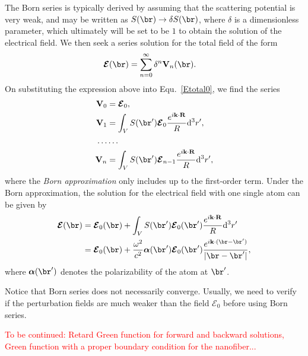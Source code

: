 \documentclass[]{report}
\begin{document}
The Born series is typically derived by assuming that the scattering potential is very
weak, and may be written as $ S(\br)\rightarrow \delta S(\br) $, where $ \delta $ is a dimensionless parameter, which ultimately will be set to be $ 1 $ to obtain the solution of the electrical field. We then seek a series solution for the total field of the form
\begin{align}
\boldsymbol{\mathcal{E}}(\br) &= \sum_{n=0}^{\infty} \delta^n \mathbf{V}_n(\br).
\end{align}
On substituting the expression above into Equ.~\ref{Etotal0}, we find the series
\begin{align}
\mathbf{V}_0 &= \boldsymbol{\mathcal{E}}_0,\\
\mathbf{V}_1 &= \int_V S(\br') \boldsymbol{\mathcal{E}}_0 \frac{e^{i\mathbf{k}\cdot \mathbf{R}}}{R} \mathrm{d}^3 r',\\
\ldots & \ldots\\
\mathbf{V}_n &= \int_V S(\br') \boldsymbol{\mathcal{E}}_{n-1} \frac{e^{i\mathbf{k}\cdot \mathbf{R}}}{R} \mathrm{d}^3 r',
\end{align}
where the \textit{Born approximation} only includes up to the first-order term. Under the Born approximation, the solution for the electrical field with one single atom can be given by
\begin{align}
\boldsymbol{\mathcal{E}} (\br) &= \boldsymbol{\mathcal{E}}_0 (\br) + \int_V S(\br') \boldsymbol{\mathcal{E}}_0 (\br') \frac{e^{i\mathbf{k}\cdot \mathbf{R}}}{R} \mathrm{d}^3 r'\\
&= \boldsymbol{\mathcal{E}}_0(\br) + \frac{\omega^2}{c^2} \boldsymbol{\alpha}(\br') \boldsymbol{\mathcal{E}}_0 (\br')\frac{e^{i\mathbf{k}\cdot (\br-\br')}}{|\br-\br'|},
\end{align}
where $ \boldsymbol{\alpha}(\br') $ denotes the polarizability of the atom at $ \br' $. 

Notice that Born series does not necessarily converge. Usually, we need to verify if the perturbation fields are much weaker than the field $ \boldsymbol{\mathcal{E}}_0 $ before using Born series. 

\textcolor{red}{To be continued: Retard Green function for forward and backward solutions, Green function with a proper boundary condition for the nanofiber...}
\end{document}
